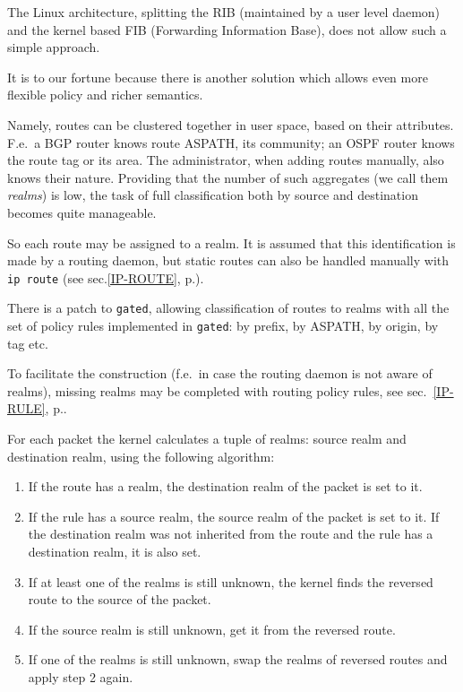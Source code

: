 The Linux architecture, splitting the RIB (maintained by a user level
daemon) and the kernel based FIB (Forwarding Information Base),
does not allow such a simple approach.

It is to our fortune because there is another solution
which allows even more flexible policy and richer semantics.

Namely, routes can be clustered together in user space, based on their
attributes.  F.e.\ a BGP router knows route ASPATH, its community;
an OSPF router knows the route tag or its area. The administrator, when adding
routes manually, also knows their nature. Providing that the number of such
aggregates (we call them {\em realms\/}) is low, the task of full
classification both by source and destination becomes quite manageable.

So each route may be assigned to a realm. It is assumed that
this identification is made by a routing daemon, but static routes
can also be handled manually with \verb|ip route| (see sec.\ref{IP-ROUTE},
p.\pageref{IP-ROUTE}).
\begin{NB}
  There is a patch to \verb|gated|, allowing classification of routes
  to realms with all the set of policy rules implemented in \verb|gated|:
  by prefix, by ASPATH, by origin, by tag etc.
\end{NB}

To facilitate the construction (f.e.\ in case the routing
daemon is not aware of realms), missing realms may be completed
with routing policy rules, see sec.~\ref{IP-RULE}, p.\pageref{IP-RULE}.

For each packet the kernel calculates a tuple of realms: source realm
and destination realm, using the following algorithm:

\begin{enumerate}
\item If the route has a realm, the destination realm of the packet is set to it.
\item If the rule has a source realm, the source realm of the packet is set to it.
If the destination realm was not inherited from the route and the rule has a destination realm,
it is also set.
\item If at least one of the realms is still unknown, the kernel finds
the reversed route to the source of the packet.
\item If the source realm is still unknown, get it from the reversed route.
\item If one of the realms is still unknown, swap the realms of reversed
routes and apply step 2 again.
\end{enumerate}

